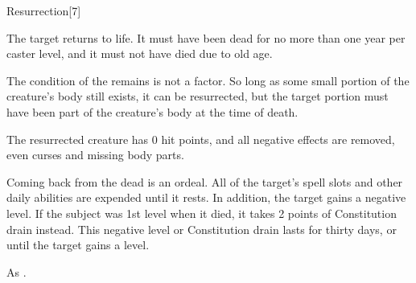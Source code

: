 \begin{spellsection}{Resurrection}[7]
    \begin{spellheader}
    \end{spellheader}
    \begin{spellcontent}
        \begin{spelltargetinginfo}
        \end{spelltargetinginfo}
        \begin{spelleffects}

            \spelleffect The target returns to life. It must have been dead for no more than one year per caster level, and it must not have died due to old age.

            The condition of the remains is not a factor. So long as some small portion of the creature's body still exists, it can be resurrected, but the target portion must have been part of the creature's body at the time of death. 

            The resurrected creature has 0 hit points, and all negative effects are removed, even curses and missing body parts.

            \par Coming back from the dead is an ordeal. All of the target's spell slots and other daily abilities are expended until it rests. In addition, the target gains a negative level. If the subject was 1st level when it died, it takes 2 points of Constitution drain instead. This negative level or Constitution drain lasts for thirty days, or until the target gains a level.
        \end{spelleffects}
    \end{spellcontent}
    \begin{spellfooter}
        \spellnotes As .
    \end{spellfooter}
\end{spellsection}


